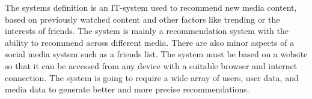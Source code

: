 The systems definition is an IT-system used to recommend new media content, based on previously watched content and other factors like trending or the interests of friends. The system is mainly a recommendation system with the ability to recommend across different media. There are also minor aspects of a social media system such as a friends list. The system must be based on a website so that it can be accessed from any device with a suitable browser and internet connection. The system is going to require a wide array of users, user data, and media data to generate better and more precise recommendations. 